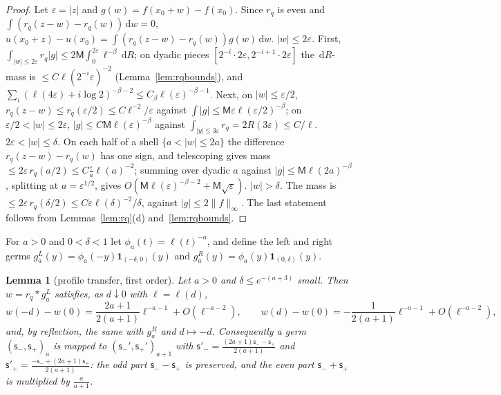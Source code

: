 \documentclass[11pt]{amsart}
\newcommand{\one}{\mathbf{1}}
\newcommand{\dd}{\,\mathrm{d}}
\newcommand{\eps}{\varepsilon}
\newtheorem{lemma}[theorem]{Lemma}
\theoremstyle{definition}
\theoremstyle{remark}
\numberwithin{equation}{section}
\begin{document}
\begin{proof}
Let $\eps=|z|$ and $g(w)=f(x_0+w)-f(x_0)$. Since $r_q$ is even and $\int(r_q(z-w)-r_q(w))\dd w=0$, $u(x_0+z)-u(x_0)=\int(r_q(z-w)-r_q(w))g(w)\dd w$.
\emph{$|w|\le2\eps$.} First, $\int_{|w|\le2\eps}r_q|g|\le2\mathsf M\int_0^{2\eps}\ell^{-\beta}\dd R$; on dyadic pieces $[2^{-i}\cdot2\eps,2^{-i+1}\cdot2\eps]$ the $\dd R$-mass is $\le C\ell(2^{-i}\eps)^{-2}$ (Lemma~\ref{lem:rqbounds}), and $\sum_i(\ell(4\eps)+i\log2)^{-\beta-2}\le C_\beta\ell(\eps)^{-\beta-1}$. Next, on $|w|\le\eps/2$, $r_q(z-w)\le r_q(\eps/2)\le C\ell^{-2}/\eps$ against $\int|g|\le \mathsf M\eps\ell(\eps/2)^{-\beta}$; on $\eps/2<|w|\le2\eps$, $|g|\le C\mathsf M\ell(\eps)^{-\beta}$ against $\int_{|y|\le3\eps}r_q=2R(3\eps)\le C/\ell$.
\emph{$2\eps<|w|\le\delta$.} On each half of a shell $\{a<|w|\le2a\}$ the difference $r_q(z-w)-r_q(w)$ has one sign, and telescoping gives mass $\le2\eps\,r_q(a/2)\le C\frac\eps a\ell(a)^{-2}$; summing over dyadic $a$ against $|g|\le \mathsf M\ell(2a)^{-\beta}$, splitting at $a=\eps^{1/2}$, gives $O(\mathsf M\ell(\eps)^{-\beta-2}+\mathsf M\sqrt\eps)$.
\emph{$|w|>\delta$.} The mass is $\le2\eps\,r_q(\delta/2)\le C\eps\ell(\delta)^{-2}/\delta$, against $|g|\le2\|f\|_\infty$.
The last statement follows from Lemmas~\ref{lem:rq}(d) and~\ref{lem:rqbounds}.
\end{proof}

For $a>0$ and $0<\delta<1$ let $\phi_a(t)=\ell(t)^{-a}$, and define the left and right germs $g^L_a(y)=\phi_a(-y)\one_{(-\delta,0)}(y)$ and $g^R_a(y)=\phi_a(y)\one_{(0,\delta)}(y)$.

\begin{lemma}[profile transfer, first order]\label{lem:transfer}
Let $a>0$ and $\delta\le e^{-(a+3)}$ small. Then $w=r_q*g^L_a$ satisfies, as $d\downarrow0$ with $\ell=\ell(d)$,
\[
w(-d)-w(0)=\frac{2a+1}{2(a+1)}\ell^{-a-1}+O(\ell^{-a-2}),\qquad w(d)-w(0)=-\frac1{2(a+1)}\ell^{-a-1}+O(\ell^{-a-2}),
\]
and, by reflection, the same with $g^R_a$ and $d\mapsto-d$. Consequently a germ $(\mathsf s_-,\mathsf s_+)_a$ is mapped to $(\mathsf s_-',\mathsf s_+')_{a+1}$ with $\mathsf s'_-=\frac{(2a+1)\mathsf s_--\mathsf s_+}{2(a+1)}$ and $\mathsf s'_+=\frac{-\mathsf s_-+(2a+1)\mathsf s_+}{2(a+1)}$: the odd part $\mathsf s_--\mathsf s_+$ is preserved, and the even part $\mathsf s_-+\mathsf s_+$ is multiplied by $\frac a{a+1}$.
\end{lemma}
\end{document}
